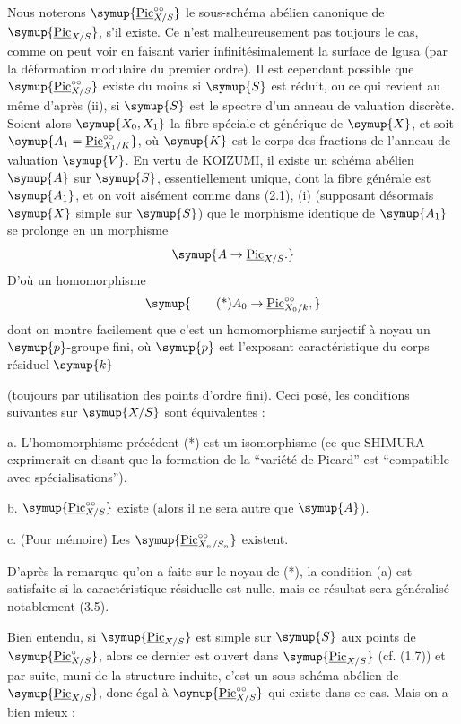  Nous noterons
$\symup{\underline{\operatorname{Pic}}_{X/S}^{\circ\circ}}$ le sous-schéma abélien canonique de
$\symup{\underline{\operatorname{Pic}}_{X/S}}$, s'il existe. Ce n'est malheureusement pas toujours
le cas, comme on peut voir en faisant varier infinitésimalement la surface de
Igusa (par la déformation modulaire du premier ordre). Il est cependant
possible que $\symup{\underline{\operatorname{Pic}}_{X/S}^{\circ\circ}}$ existe du moins si $\symup{S}$
est réduit, ou ce qui revient au même d'après (ii), si $\symup{S}$ est le spectre d'un
anneau de valuation discrète. Soient alors $\symup{X_0,X_1}$ la fibre spéciale et
générique de $\symup{X}$, et soit $\symup{A_1=\underline{\operatorname{Pic}}_{X_1/K}^{\circ\circ}}$, où $\symup{K}$ est le corps des fractions de l'anneau de valuation $\symup{V}$. En vertu de
KOIZUMI, il existe un schéma abélien $\symup{A}$ sur $\symup{S}$, essentiellement unique, dont
la fibre générale est $\symup{A_1}$, et on voit aisément comme dans (2.1), (i)
(supposant désormais $\symup{X}$ simple sur $\symup{S}$) que le morphisme identique de $\symup{A_1}$
se prolonge en un morphisme
\[
\symup{A\to\underline{\operatorname{Pic}}_{X/S}.}
\]
D'où un homomorphisme
\[
\symup{\tag{*}A_0\to\underline{\operatorname{Pic}}_{X_0/k}^{\circ\circ},}
\]
dont on montre facilement que c'est un homomorphisme surjectif à noyau un
$\symup{p}$-groupe fini, où $\symup{p}$ est l'exposant caractéristique du corps résiduel $\symup{k}$

(toujours par utilisation des points d'ordre fini). Ceci posé, les conditions
suivantes sur $\symup{X/S}$ sont équivalentes :

\medskip
\noindent a. L'homomorphisme précédent (*) est un isomorphisme (ce que SHIMURA
exprimerait en disant que la formation de la ``variété de Picard'' est
``compatible avec spécialisations'').

\noindent b. $\symup{\underline{\operatorname{Pic}}_{X/S}^{\circ\circ}}$ existe (alors il ne sera
autre que $\symup{A}$).

\noindent c. (Pour mémoire) Les
$\symup{\underline{\operatorname{Pic}}_{X_n/S_n}^{\circ\circ}}$ existent.

D'après la remarque qu'on a faite sur le noyau de (*), la condition (a) est
satisfaite si la caractéristique résiduelle est nulle, mais ce résultat sera
généralisé notablement (3.5).

Bien entendu, si $\symup{\underline{\operatorname{Pic}}_{X/S}}$ est simple sur $\symup{S}$ aux points de
$\symup{\underline{\operatorname{Pic}}_{X/S}^\circ}$, alors ce dernier est ouvert dans
$\symup{\underline{\operatorname{Pic}}_{X/S}}$ (cf. (1.7)) et par suite, muni de la structure
induite, c'est un sous-schéma abélien de $\symup{\underline{\operatorname{Pic}}_{X/S}}$, donc égal
à $\symup{\underline{\operatorname{Pic}}_{X/S}^{\circ\circ}}$ qui existe dans ce cas. Mais on a
bien mieux :

